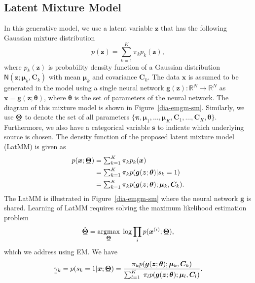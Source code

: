 \subsection{Latent Mixture Model}\label{subsec-latmm}

In this generative model, we use a latent variable $\bm{z}$ that has the following Gaussian mixture distribution
\begin{equation}
  p(\bm{z}) = \sum_{k=1}^K \pi_k p_k(\bm{z}), %
\end{equation}
where $p_k(\bm{z})$ is probability density function of a Gaussian distribution $\mathsf{N}(\bm{z};\bm{\mu}_k,\bm{C}_k)$ with mean $\bm{\mu}_k$ and covariance $\bm{C}_k$.
The data $\bm{x}$ is
assumed to be generated in the model using a single neural network
$\bm{g}(\bm{z}): \mathbb{R}^N \rightarrow \mathbb{R}^N$ as
$\bm{x}=\bm{g}(\bm{z};\bm{\theta})$, where $\bm{\theta}$
is the set of parameters of the neural network. The diagram of this mixture model
is shown in Figure~\ref{dia-emgm-sm}. Similarly, we use $\ubar{\bm{\Theta}}$ to denote the set of all parameters $\{ \bm{\pi},
\bm{\mu}_1,\hdots, \bm{\mu}_K, \bm{C}_1,\hdots,
\bm{C}_K, \bm{\theta} \}$. Furthermore, we also have a categorical variable $\bm{s}$ to indicate which underlying source is chosen. The density function of the proposed latent mixture model (LatMM) is given as
\begin{align}\label{eq:SecondMixtureModel}
  p(\bm{x};\ubar{\bm{\Theta}}) & = \textstyle\sum_{k=1}^K \pi_k p_k(\bm{x}) \nonumber\\
                               &= \textstyle\sum_{k=1}^K \pi_k  p(\bm{g}(\bm{z}; \bm{\theta})| s_k=1) \nonumber \\
                               & = \textstyle\sum_{k=1}^K \pi_k  p(\bm{g}(\bm{z};\bm{\theta}); \bm{\mu}_k, \bm{C}_k).
\end{align}
The LatMM is illustrated in Figure~\ref{dia-emgm-sm} where the neural network $\bm{g}$ is shared. Learning of LatMM requires solving the maximum likelihood estimation problem
\begin{equation}
  \ubar{\hat{\bm{\Theta}}} =    \uargmax{\ubar{\bm{\Theta}}}{} \log \prod_{i} p(\bm{x}^{(i)};\ubar{\bm{\Theta}}),
\end{equation}
which we address using EM.
We have
\begin{align}\label{eq-latMM-gamma}
  \ubar{\gamma}_k = p(s_k =1|\bm{x};\ubar{\bm{\Theta}})  
  = \frac{\pi_k p(\bm{g}(\bm{z};\bm{\theta});\bm{\mu}_k, \bm{C}_k)}{\sum_{l=1}^K\; \pi_l p(\bm{g}(\bm{z};\bm{\theta});\bm{\mu}_l, \bm{C}_l)}.
\end{align}

